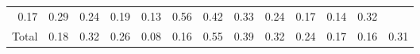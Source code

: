 \begin{table}[!h]
\begin{tabular}{lllllllllllll}
  \multicolumn{1}{|r}{0.17} &
  \multicolumn{1}{r}{0.29} &
  \multicolumn{1}{r}{0.24} &
  \multicolumn{1}{r}{0.19} &
  \multicolumn{1}{r}{0.13} &
  \multicolumn{1}{r}{0.56} &
  \multicolumn{1}{r}{0.42} &
  \multicolumn{1}{r}{0.33} &
  \multicolumn{1}{r}{0.24} &
  \multicolumn{1}{r}{0.17} &
  \multicolumn{1}{r}{0.14} &
  \multicolumn{1}{r}{0.32} \\
\multicolumn{1}{l}{\hspace{1em}Total} &
  \multicolumn{1}{|r}{0.18} &
  \multicolumn{1}{r}{0.32} &
  \multicolumn{1}{r}{0.26} &
  \multicolumn{1}{r}{0.08} &
  \multicolumn{1}{r}{0.16} &
  \multicolumn{1}{r}{0.55} &
  \multicolumn{1}{r}{0.39} &
  \multicolumn{1}{r}{0.32} &
  \multicolumn{1}{r}{0.24} &
  \multicolumn{1}{r}{0.17} &
  \multicolumn{1}{r}{0.16} &
  \multicolumn{1}{r}{0.31} \\
\cline{1-13}
\end{tabular}
\end{table}
